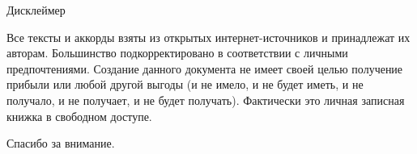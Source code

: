 {\fontsize{20pt}{24pt}\centerline{Дисклеймер}}
\par\vspace{12pt}
{\parindent=10pt
Все тексты и аккорды взяты из открытых интернет-источников и принадлежат
их авторам.
Большинство подкорректировано в соответствии с личными предпочтениями.
Создание данного документа не имеет своей целью получение прибыли или
любой другой выгоды (и не имело, и не будет иметь, и не получало,
и не получает, и не будет получать). Фактически это личная
записная книжка в свободном доступе.
\par\indent
Спасибо за внимание.
}
